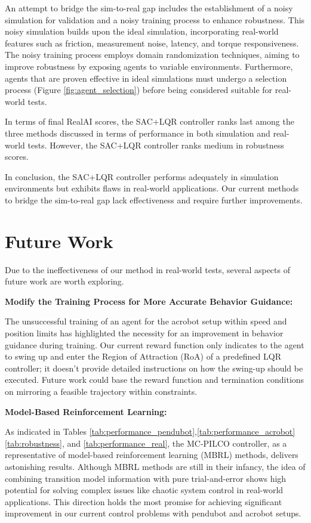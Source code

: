 An attempt to bridge the sim-to-real gap includes the establishment of a noisy simulation for validation and a noisy training process to enhance robustness. This noisy simulation builds upon the ideal simulation, incorporating real-world features such as friction, measurement noise, latency, and torque responsiveness. The noisy training process employs domain randomization techniques, aiming to improve robustness by exposing agents to variable environments. Furthermore, agents that are proven effective in ideal simulations must undergo a selection process (Figure \ref{fig:agent_selection}) before being considered suitable for real-world tests.

In terms of final RealAI scores, the SAC+LQR controller ranks last among the three methods discussed in terms of performance in both simulation and real-world tests. However, the SAC+LQR controller ranks medium in robustness scores.

In conclusion, the SAC+LQR controller performs adequately in simulation environments but exhibits flaws in real-world applications. Our current methods to bridge the sim-to-real gap lack effectiveness and require further improvements.

\section{Future Work}
Due to the ineffectiveness of our method in real-world tests, several aspects of future work are worth exploring.

\textbf{Modify the Training Process for More Accurate Behavior Guidance:}

The unsuccessful training of an agent for the acrobot setup within speed and position limits has highlighted the necessity for an improvement in behavior guidance during training. Our current reward function only indicates to the agent to swing up and enter the Region of Attraction (RoA) of a predefined LQR controller; it doesn't provide detailed instructions on how the swing-up should be executed. Future work could base the reward function and termination conditions on mirroring a feasible trajectory within constraints.

\textbf{Model-Based Reinforcement Learning:}

As indicated in Tables \ref{tab:performance_pendubot},\ref{tab:performance_acrobot} \ref{tab:robustness}, and \ref{tab:performance_real}, the MC-PILCO controller, as a representative of model-based reinforcement learning (MBRL) methods, delivers astonishing results. Although MBRL methods are still in their infancy, the idea of combining transition model information with pure trial-and-error shows high potential for solving complex issues like chaotic system control in real-world applications. This direction holds the most promise for achieving significant improvement in our current control problems with pendubot and acrobot setups.

